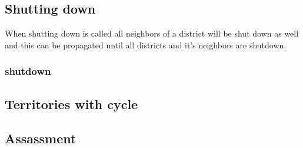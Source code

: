 \documentclass[11pt,a4paper]{article}
\begin{document}
\subsection{Shutting down}
When shutting down is called all neighbors of a district will be shut down as well and this can be propagated until all districts and it's neighbors are shutdown.

\subsubsection{shutdown}

\subsection{Territories with cycle}


\subsection{Assassment}

\end{document}
